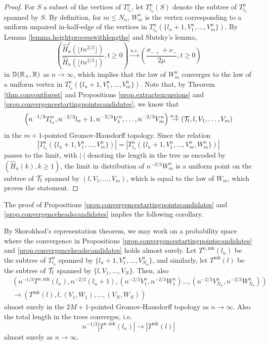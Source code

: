 \begin{proof}
For $S$ a subset of the vertices of $T^n_{l_n}$, let $T^n_{l_n}(S)$ denote the subtree of $T^n_{l_n}$ spanned by $S$. By definition, for $m\leq N_n$, $W^n_m$ is the vertex corresponding to a uniform unpaired in-half-edge of the vertices in $T^n_{l_n}\left(\{l_n+1,V^n_1,\dots,V^n_{m}\}\right)$. By Lemma \ref{lemma.heightprocesswithlengths} and Slutsky's lemma,
$$\left(\frac{\hat{H}_n^\ell\left(\lfloor t n^{2/3}\rfloor \right)}{\hat{H}_n\left(\lfloor t n^{2/3}\rfloor \right)},t\geq 0\right)\overset{a.s.}{\to} \left(\frac{\sigma_{-+}+\nu_-}{2\mu},t\geq 0\right)$$
in ${\mathbb D}({\mathbb R}_+,{\mathbb R})$ as $n\to \infty$, which implies that the law of $W^n_m$ converges to the law of a uniform vertex in $T^n_{l_n}\left(\{l_n+1,V^n_1,\dots,V^n_{m}\}\right)$. 
Note that, by Theorem \ref{thm.convoutforest} and  Propositions \ref{prop.extractexcursions} and \ref{prop.convergencestartingpointscandidates}, we know that
$$\left(n^{-1/3}T^n_{l_n},n^{-2/3}l_n+1,n^{-2/3}V^n_1,\dots,n^{-2/3}V^n_{m}\right)\overset{a.s.}{\to}\left({\mathcal T}_l, l,V_1,\dots,V_m\right)$$
in the $m+1$-pointed Gromov-Hausdorff topology. Since the relation $$\left|T^n_{l_n}\left(\{l_n+1,V^n_1,\dots,V^n_{m}\}\right)\right|=\left|T^n_{l_n}\left(\{l_n+1,V^n_1,\dots,V^n_{m}, W^n_{m}\}\right)\right|$$ passes to the limit, with $|\cdot|$ denoting the length in the tree as encoded by $(\hat{H}_n(k),k\geq 1)$, the limit in distribution of $n^{-2/3}W^n_m$ is a uniform point on the subtree of ${\mathcal T}_l$ spanned by $\left(l,V_1,\dots,V_m\right)$, which is equal to the law of $W_m$, which proves the statement.

\end{proof}
The proof of Propositions \ref{prop.convergencestartingpointscandidates} and \ref{prop.convergenceheadscandidates} implies the following corollary.
\begin{corollary}
By Skorokhod's representation theorem, we may work on a probability space where the convergence in Propositions \ref{prop.convergencestartingpointscandidates} and \ref{prop.convergenceheadscandidates} holds almost surely. Let $T^{n,\text{mk}}(l_n)$ be the subtree of $T^n_{l_n}$ spanned by $\{l_n+1,V^n_1,\dots,V^n_{N_n}\}$, and similarly, let $T^{\text{mk}}(l)$ be the subtree of ${\mathcal T}_l$ spanned by $\{l,V_1,\dots,V_N\}$. Then, also 
\begin{align*}&\left(n^{-1/3}T^{n,\text{mk}}(l_n), n^{-2/3}(l_n+1), \left(n^{-2/3}V^n_1,n^{-2/3}W^n_1\right) \dots, \left(n^{-2/3}V^n_{N_n}, n^{-2/3}W^n_{N_n}\right)\right)\\
&\to \left(T^{\text{mk}}(l), l, (V_1,W_1),\dots, (V_{N},W_{N})\right)\end{align*}
almost surely in the $2M+1$-pointed Gromov-Hausdorff topology as $n\to \infty$. Also the total length in the trees converges, i.e.
$$n^{-1/3}\left|T^{n,\text{mk}}(l_n)\right|\to \left| T^{\text{mk}}(l)\right|$$
almost surely as $n\to\infty$.
\end{corollary}
